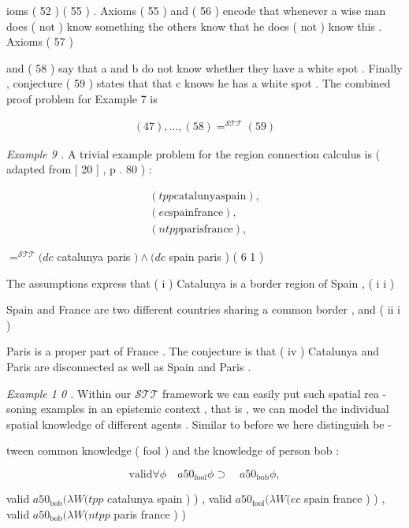 \documentclass[10pt]{article}
\begin{document}
\noindent ioms ( 52 ) \quad ( 55 ) . Axioms ( 55 ) and ( 56 ) encode that whenever a wise man does 
 ( not ) know something the others know that he does ( not ) know this . Axioms ( 57 ) 


\newpage
\noindent and ( 58 ) say that a and b do not know whether they have a white spot . Finally , 
 conjecture ( 59 ) states that that c knows he has a white spot . The combined 
 proof problem for Example 7 is 

\begin{align*}
 (  47  )  ,   .   .   .   ,   (  58  )   = ^{ \mathcal{STT} }  (  59  ) \tag*{$ (  60  ) $}
\end{align*}

\noindent \textit{Example 9 . } \quad A trivial example problem for the \quad region connection calculus is 
 ( adapted from [ 20 ] , p . 80 ) : 

\[\begin{aligned} (  tpp   \mathrm{catalunya}   \mathrm{spain}  )  , \\
  (  ec   \mathrm{spain}   \mathrm{france}  )  , \\
  (  ntpp   \mathrm{paris}   \mathrm{france}  )  , \end{aligned}\]


\hspace*{\fill} $ = ^{ \mathcal{STT} }  (  dc $  catalunya paris  $ )   \wedge   (  dc $  spain paris ) \quad ( 6 1 ) 

\noindent The assumptions express that \hfill ( i ) \hfill Catalunya is a border region of Spain , \hfill ( i i ) 

\noindent Spain and France are two different countries sharing a common border , and ( ii i ) 

\noindent Paris is a proper part of France . The conjecture is that ( iv ) Catalunya and Paris 
 are disconnected as well as Spain and Paris . 

\noindent \textit{Example 1 0 . } \quad Within our  $ \mathcal{STT} $  framework we can easily put such spatial rea - 
 soning examples in an epistemic context , that is , we can model the individual 
 spatial knowledge of different agents . Similar to before we here distinguish be - 

\noindent tween common knowledge ( fool ) and the knowledge of person bob : 

\[ \mathrm{valid}   \forall  \phi  \quad  a50 _{ \mathrm{fool} }  \phi   \supset  \quad  a50 _{ \mathrm{bob} }  \phi  , \]


\noindent valid  $ a50 _{ \mathrm{bob} }  (  \lambda  W   (  tpp $  catalunya spain ) ) , 
 valid  $ a50 _{ \mathrm{fool} }  (  \lambda  W   (  ec $  spain france ) ) , 
 valid  $ a50 _{ \mathrm{bob} }  (  \lambda  W   (  ntpp $  paris france ) ) 
\end{document}
